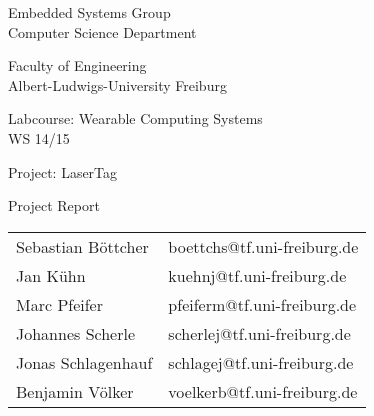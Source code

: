 

\pagestyle{empty}

\clearscrheadings\clearscrplain



\begin{center}
\begin{Huge}
Embedded Systems Group\\
\vspace{-2mm}
Computer Science Department\\
\vspace{3mm}
\end{Huge}{\Large Faculty of Engineering}\\
\vspace{3mm}
{\Large Albert-Ludwigs-University Freiburg}\\
\vspace{8mm}
\vspace{8mm}
\begin{Large}
Labcourse: Wearable Computing Systems\\
WS 14/15\\
\vspace{8mm}
\end{Large}
\begin{Huge}
Project: LaserTag\\
\vspace{8mm}
\end{Huge}
\begin{Large}
Project Report\\
\end{Large}
\vspace{50mm}
\begin{tabular}{ll}
Sebastian Böttcher &  boettchs@tf.uni-freiburg.de\\
Jan Kühn &  kuehnj@tf.uni-freiburg.de\\
Marc Pfeifer &  pfeiferm@tf.uni-freiburg.de\\
Johannes Scherle &  scherlej@tf.uni-freiburg.de\\
Jonas Schlagenhauf &  schlagej@tf.uni-freiburg.de\\
Benjamin Völker & voelkerb@tf.uni-freiburg.de \\
\end{tabular}


\end{center}
\thispagestyle{empty}
\clearpage


\pagestyle{useheadings} %
\renewcommand*{\chapterheadstartvskip}{\vspace{-2cm}}

\tableofcontents













